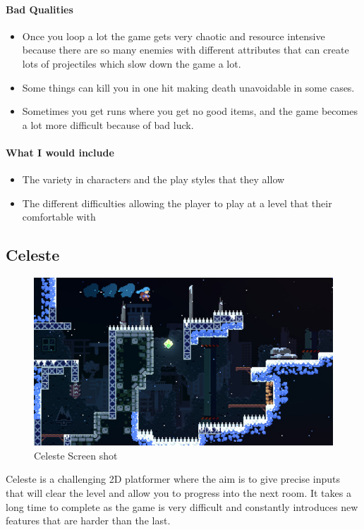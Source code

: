 \documentclass{article}
\begin{document}
\paragraph{Bad Qualities}
\begin{itemize}
\item Once you loop a lot the game gets very chaotic and resource intensive because there are so many enemies with different attributes that can create lots of projectiles which slow down the game a lot.  
\item Some things can kill you in one hit making death unavoidable in some cases. 
\item Sometimes you get runs where you get no good items, and the game becomes a lot more difficult because of bad luck. 
\end{itemize}


\paragraph{What I would include}
\begin{itemize}
\item The variety in characters and the play styles that they allow 
\item The different difficulties allowing the player to play at a level that their comfortable with 
\end{itemize}


\subsection{Celeste}
\begin{figure}[h]
\includegraphics[width=\linewidth]{Celeste ss}
\caption{\cite{Celss} Celeste Screen shot}
\end{figure}
Celeste is a challenging 2D platformer where the aim is to give precise inputs that will clear the level and allow you to progress into the next room. It takes a long time to complete as the game is very difficult and constantly introduces new features that are harder than the last.
\end{document}
